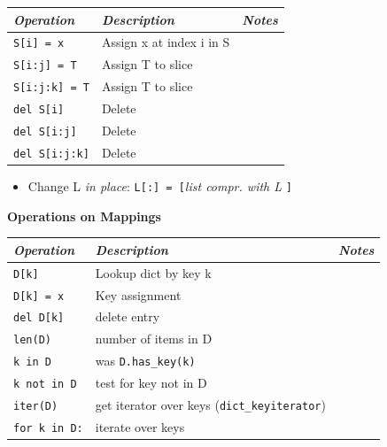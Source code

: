 \documentclass[9pt,a4wide]{extarticle}
\begin{document}
\begin{supertabular}{|l|p{12cm}|c|}\hline
{\em Operation }     &   {\em  Description}         & {\em  Notes} \\ \hline\hline

{\tt S[i] = x}       &   Assign x at index i in S   &        \\ \hline
{\tt S[i:j] = T}     &   Assign T to slice          &        \\ \hline
{\tt S[i:j:k] = T}   &   Assign T to slice          &        \\ \hline
{\tt del S[i]}       &   Delete                     &        \\ \hline
{\tt del S[i:j]}     &   Delete                     &        \\ \hline
{\tt del S[i:j:k]}   &   Delete                     &        \\ \hline
\end{supertabular}


\begin{itemize}
\item Change L {\em in place}: {\tt L[:] = [}{\em list compr. with L} {\tt ]}
\end{itemize}


\bigskip
{\bf Operations on Mappings}

\begin{supertabular}{|l|p{12cm}|c|}\hline
{\em Operation }     &   {\em  Description}         & {\em  Notes} \\ \hline\hline

{\tt D[k]}            &  Lookup dict by key k       &        \\ \hline
{\tt D[k] = x}        &  Key assignment             &        \\ \hline
{\tt del D[k]}        &  delete entry               &        \\ \hline
{\tt len(D)}          &  number of items in D       &        \\ \hline
{\tt k in D}          &  was {\tt D.has\_key(k)}    &        \\ \hline
{\tt k not in D}      &  test for key not in D      &        \\ \hline
{\tt iter(D)}         &  get iterator over keys ({\tt dict\_keyiterator})     &        \\ \hline
{\tt for k in D:}     &  iterate over keys          &        \\ \hline
\end{supertabular}
\end{document}
